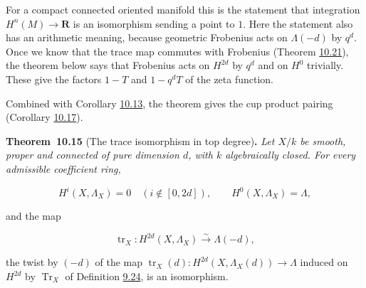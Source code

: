 \documentclass[11pt]{article}
\newenvironment{bpstatement}[2]{\par\addvspace{0.6\baselineskip}\noindent\textbf{#1}#2\textbf{.}\enspace\ignorespaces}
  {\par\addvspace{0.4\baselineskip}}
\newenvironment{bpstatementit}[2]{\begin{bpstatement}{#1}{#2}\itshape\ignorespaces}{\end{bpstatement}}
\begin{document}
For a compact connected oriented manifold this is the statement that integration \(H^n(M)\to\mathbf R\) is an isomorphism sending a point to \(1\). Here the statement also has an arithmetic meaning, because geometric Frobenius acts on \(\Lambda(-d)\) by \(q^d\). Once we know that the trace map commutes with Frobenius (Theorem \hyperref[bp165]{10.21}), the theorem below says that Frobenius acts on \(H^{2d}\) by \(q^d\) and on \(H^0\) trivially. These give the factors \(1-T\) and \(1-q^dT\) of the zeta function.

Combined with Corollary \hyperref[bp140]{10.13}, the theorem gives the cup product pairing (Corollary \hyperref[bp152]{10.17}).

\label{bp146}%
\begin{bpstatementit}{Theorem~10.15}{ (The trace isomorphism in top degree)}
Let \(X/k\) be smooth, proper and connected of pure dimension \(d\), with \(k\) algebraically closed. For every admissible coefficient ring,

\[
H^i(X,\Lambda_X)=0\quad(i\notin[0,2d]),\qquad
H^0(X,\Lambda_X)=\Lambda,
\]

and the map

\[
\operatorname{tr}_X:H^{2d}(X,\Lambda_X)
\xrightarrow{\sim}\Lambda(-d),
\]

the twist by \((-d)\) of the map \(\operatorname{tr}_X(d):H^{2d}(X,\Lambda_X(d))\to\Lambda\) induced on \(H^{2d}\) by \(\operatorname{Tr}_X\) of Definition \hyperref[bp85]{9.24}, is an isomorphism.
\end{bpstatementit}
\end{document}
